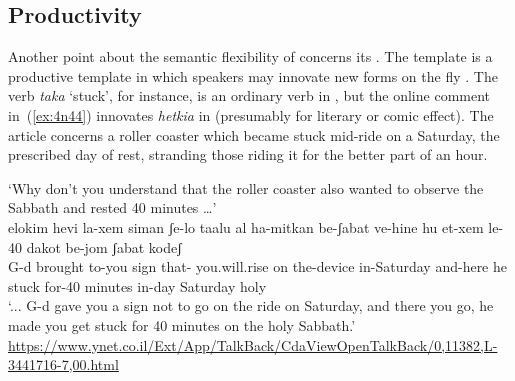 \begin{exe}
\begin{xlist}
\begin{xlist}
\begin{exe}
\begin{exe}
\begin{xlist}
\begin{exe}
\begin{xlist}
\begin{exe}
\begin{xlist}
\begin{xlist}
\begin{exe}
\begin{xlist}
\begin{exe}
\begin{xlist}
\begin{exe}
\begin{xlist}
\begin{exe}
\begin{exe}
\begin{exe}
\begin{xlist}
\begin{exe}
\begin{exe}
\begin{xlist}
\begin{xlist}
\begin{exe}
\begin{xlist}
\begin{exe}
\begin{exe}
\begin{xlist}
\begin{exe}
\begin{exe}
\begin{xlist}
\begin{exe}
\begin{xlist}
\begin{exe}
\begin{xlist}
\begin{exe}
\begin{xlist}
\begin{exe}
\begin{exe}
\begin{xlist}
\begin{exe}
\begin{exe}
\begin{xlist}
\begin{xlist}
\begin{exe}
\begin{xlist}
\begin{xlist}
\begin{exe}
\begin{xlist}
\begin{exe}
\begin{xlist}
\begin{exe}
\begin{xlist}
\begin{exe}
\begin{xlist}
\begin{exe}
\begin{exe}
\begin{exe}
\begin{exe}
\begin{xlist}
	\subsection{Productivity}\label{vd:caus:product}\largerpage[-1]
Another point about the semantic flexibility of {\vd} concerns its . The template {\thif} is a productive  template in which speakers may innovate new forms on the fly \citep{lev16}. The verb \emph{taka} `stuck', for instance, is an ordinary  verb in {\tkal}, but the online comment in~(\ref{ex:4n44}) innovates \emph{hetkia} in {\thif} (presumably for literary or comic effect). The article concerns a roller coaster which became stuck mid-ride on a Saturday, the prescribed day of rest, stranding those riding it for the better part of an hour.
 \begin{exe}
\ex  \label{ex:4n44}`Why don't you understand that the roller coaster also wanted to observe the Sabbath and rested 40 minutes {\dots}'  \\
	{  elokim hevi la-xem siman ʃe-lo taalu al ha-mitkan be-ʃabat ve-hine hu  et-xem le-40 dakot be-jom ʃabat kodeʃ\\
 	  {} G-d brought to-you sign that- you.will.rise on the-device in-Saturday and-here he stuck  for-40 minutes in-day Saturday holy\\
 	\glt `{...} G-d gave you a sign not to go on the ride on Saturday, and there you go, he made you get stuck for 40 minutes on the holy Sabbath.' \href{https://www.ynet.co.il/Ext/App/TalkBack/CdaViewOpenTalkBack/0,11382,L-3441716-7,00.html}{https://www.\linebreak ynet.co.il/Ext/App/TalkBack/CdaViewOpenTalkBack/0,11382,L-3441716-7\linebreak,00.html}}
 \z 

\end{exe}
\end{xlist}
\end{exe}
\end{exe}
\end{exe}
\end{exe}
\end{xlist}
\end{exe}
\end{xlist}
\end{exe}
\end{xlist}
\end{exe}
\end{xlist}
\end{exe}
\end{xlist}
\end{xlist}
\end{exe}
\end{xlist}
\end{xlist}
\end{exe}
\end{exe}
\end{xlist}
\end{exe}
\end{exe}
\end{xlist}
\end{exe}
\end{xlist}
\end{exe}
\end{xlist}
\end{exe}
\end{xlist}
\end{exe}
\end{exe}
\end{xlist}
\end{exe}
\end{exe}
\end{xlist}
\end{exe}
\end{xlist}
\end{xlist}
\end{exe}
\end{exe}
\end{xlist}
\end{exe}
\end{exe}
\end{exe}
\end{xlist}
\end{exe}
\end{xlist}
\end{exe}
\end{xlist}
\end{exe}
\end{xlist}
\end{xlist}
\end{exe}
\end{xlist}
\end{exe}
\end{xlist}
\end{exe}
\end{exe}
\end{xlist}
\end{xlist}
\end{exe}
